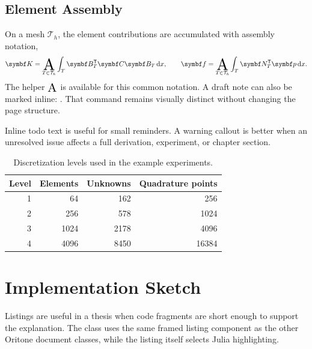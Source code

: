 \subsection{Element Assembly}
\label{sec:assembly}

On a mesh \(\mathcal{T}_h\), the element contributions are accumulated with
assembly notation,
\begin{equation}
  \bs{K}
  =
  \Assembly_{T\in\mathcal{T}_h}
  \int_T
    \bs{B}_T^\mathsf{T}\bs{C}\bs{B}_T
  \intd{x},
  \qquad
  \bs{f}
  =
  \Assembly_{T\in\mathcal{T}_h}
  \int_T
    \bs{N}_T^\mathsf{T}\bs{p}
  \intd{x}.
  \label{eq:assembly}
\end{equation}
The helper \(\Assembly\) is available for this common notation. A draft note can
also be marked inline: . That command remains visually distinct without changing the page
structure.

\begin{oritonewarning}
Inline todo text is useful for small reminders. A warning callout is better when
an unresolved issue affects a full derivation, experiment, or chapter section.
\end{oritonewarning}

\begin{table}[tbp]
  \centering
  \caption{Discretization levels used in the example experiments.}
  \label{tab:levels}
  \begin{tabular}{rrrr}
    \toprule
    Level & Elements & Unknowns & Quadrature points \\
    \midrule
    1 & 64 & 162 & 256 \\
    2 & 256 & 578 & 1024 \\
    3 & 1024 & 2178 & 4096 \\
    4 & 4096 & 8450 & 16384 \\
    \bottomrule
  \end{tabular}
\end{table}

\section{Implementation Sketch}
\label{sec:implementation-sketch}

Listings are useful in a thesis when code fragments are short enough to support
the explanation. The class uses the same framed listing component as the other
Oritone document classes, while the listing itself selects Julia highlighting.

